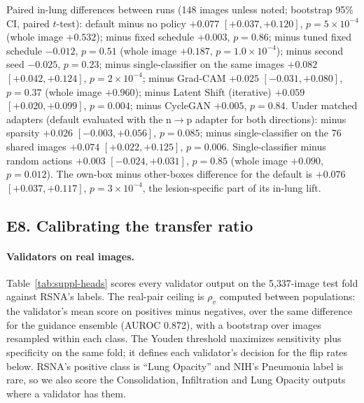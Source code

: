 Paired in-lung differences between runs (148 images unless noted; bootstrap 95\% CI, paired $t$-test): default minus no policy $+0.077$ $[+0.037, +0.120]$, $p=5\times10^{-4}$ (whole image $+0.532$); minus fixed schedule $+0.003$, $p=0.86$; minus tuned fixed schedule $-0.012$, $p=0.51$ (whole image $+0.187$, $p=1.0\times10^{-4}$); minus second seed $-0.025$, $p=0.23$; minus single-classifier on the same images $+0.082$ $[+0.042, +0.124]$, $p=2\times10^{-4}$; minus Grad-CAM $+0.025$ $[-0.031, +0.080]$, $p=0.37$ (whole image $+0.960$); minus Latent Shift (iterative) $+0.059$ $[+0.020, +0.099]$, $p=0.004$; minus CycleGAN $+0.005$, $p=0.84$. Under matched adapters (default evaluated with the n$\to$p adapter for both directions): minus sparsity $+0.026$ $[-0.003, +0.056]$, $p=0.085$; minus single-classifier on the 76 shared images $+0.074$ $[+0.022, +0.125]$, $p=0.006$. Single-classifier minus random actions $+0.003$ $[-0.024, +0.031]$, $p=0.85$ (whole image $+0.090$, $p=0.012$). The own-box minus other-boxes difference for the default is $+0.076$ $[+0.037, +0.117]$, $p=3\times10^{-4}$, the lesion-specific part of its in-lung lift.

\subsection*{E8. Calibrating the transfer ratio}
\label{sec:suppl-transfer-calib}

\paragraph{Validators on real images.} Table~\ref{tab:suppl-heads} scores every validator output on the 5{,}337-image test fold against RSNA's labels. The real-pair ceiling is $\rho_v$ computed between populations: the validator's mean score on positives minus negatives, over the same difference for the guidance ensemble (AUROC 0.872), with a bootstrap over images resampled within each class. The Youden threshold maximizes sensitivity plus specificity on the same fold; it defines each validator's decision for the flip rates below. RSNA's positive class is ``Lung Opacity'' and NIH's Pneumonia label is rare, so we also score the Consolidation, Infiltration and Lung Opacity outputs where a validator has them.

